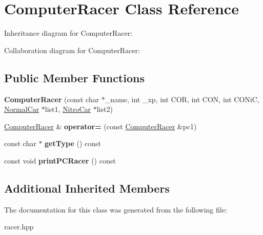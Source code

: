 \hypertarget{classComputerRacer}{}\section{Computer\+Racer Class Reference}
\label{classComputerRacer}


Inheritance diagram for Computer\+Racer\+:


Collaboration diagram for Computer\+Racer\+:
\subsection*{Public Member Functions}
\begin{DoxyCompactItemize}
\item 
{\bfseries Computer\+Racer} (const char $\ast$\+\_\+name, int \+\_\+xp, int C\+OR, int C\+ON, int C\+O\+NiC, \hyperlink{classNormalCar}{Normal\+Car} $\ast$list1, \hyperlink{classNitroCar}{Nitro\+Car} $\ast$list2)\hypertarget{classComputerRacer_a7a01a1d34b01a85defefe184d0da3e3a}{}\label{classComputerRacer_a7a01a1d34b01a85defefe184d0da3e3a}

\item 
\hyperlink{classComputerRacer}{Computer\+Racer} \& {\bfseries operator=} (const \hyperlink{classComputerRacer}{Computer\+Racer} \&pc1)\hypertarget{classComputerRacer_a7dff8e40fbdc3a09bffb98a144dcf8c7}{}\label{classComputerRacer_a7dff8e40fbdc3a09bffb98a144dcf8c7}

\item 
const char $\ast$ {\bfseries get\+Type} () const \hypertarget{classComputerRacer_a1b1a501c2191256181d286b304acd76c}{}\label{classComputerRacer_a1b1a501c2191256181d286b304acd76c}

\item 
const void {\bfseries print\+P\+C\+Racer} () const \hypertarget{classComputerRacer_a9d43c5e305cda51a81dbc2d704d9a514}{}\label{classComputerRacer_a9d43c5e305cda51a81dbc2d704d9a514}

\end{DoxyCompactItemize}
\subsection*{Additional Inherited Members}


The documentation for this class was generated from the following file\+:\begin{DoxyCompactItemize}
\item 
racer.\+hpp\end{DoxyCompactItemize}
